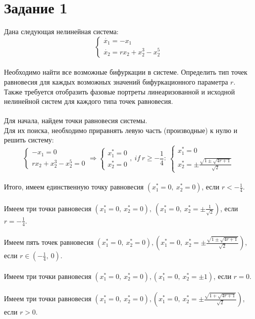 \documentclass[12pt]{article}
\begin{document}
\section*{Задание 1}
Дана следующая нелинейная система:
\[
\begin{cases}
    \dot{x_1} = -x_1\\
    \dot{x_2} = r x_2 + x_2^3 - x_2^5
\end{cases}
\]\\
Необходимо найти все возможные бифуркации в системе. Определить тип точек равновесия для каждых возможных значений бифуркационного параметра $r$.\\
Также требуется отобразить фазовые портреты линеаризованной и исходной нелинейной систем для каждого типа точек равновесия.\\
\ \\
Для начала, найдем точки равновесия системы.\\
Для их поиска, необходимо приравнять левую часть (производные) к нулю и решить систему:
\[
\begin{cases}
    -x_1 = 0\\
    r x_2 + x_2^3 - x_2^5 = 0
\end{cases}
\Rightarrow
\begin{cases}
    x_1^* = 0\\
    x_2^* = 0
\end{cases}, \ if \ r \geq - \frac{1}{4}: \
\begin{cases}
    x_1^* = 0\\
    x_2^* = \pm \frac{\sqrt{1 \pm \sqrt{4r+1}}}{\sqrt{2}}
\end{cases}
\]\\
Итого, имеем единственную точку равновесия $(x_1^*=0,\ x_2^*=0)$, если $r < - \frac{1}{4}$. \\
\ \\
Имеем три точки равновесия $(x_1^*=0,\ x_2^*=0), \ (x_1^*=0,\ x_2^*=\pm \frac{1}{\sqrt{2}})$, если $r=-\frac{1}{4}$.\\
\ \\
Имеем пять точек равновесия $(x_1^*=0,\ x_2^*=0), (x_1^*=0,\ x_2^*=\pm \frac{\sqrt{1 \pm \sqrt{4r+1}}}{\sqrt{2}})$, если $r \in (- \frac{1}{4},\ 0)$.\\
\ \\
Имеем три точки равновесия $(x_1^*=0,\ x_2^*=0), (x_1^*=0,\ x_2^*=\pm 1)$, если $r=0$.\\
\ \\
Имеем три точки равновесия $(x_1^*=0,\ x_2^*=0), (x_1^*=0,\ x_2^*=\pm \frac{\sqrt{1 + \sqrt{4r+1}}}{\sqrt{2}})$, если $r>0$.\\
\end{document}
